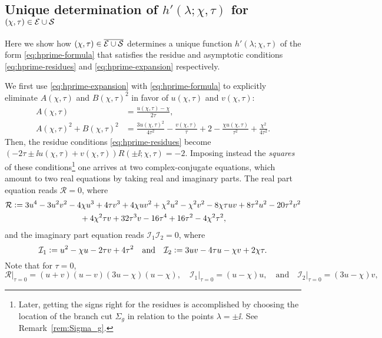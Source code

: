 
\subsection{Unique determination of $h'(\lambda;\chi,\tau)$ for $(\chi,\tau)\in\mathcal{E}\cup\mathcal{S}$}
\label{sec:g-function}
Here we show how $(\chi,\tau)\in\overline{\mathcal{E}\cup\mathcal{S}}$ determines a unique function $h'(\lambda;\chi,\tau)$ of the form \eqref{eq:hprime-formula} that satisfies the residue and asymptotic conditions \eqref{eq:hprime-residues} and \eqref{eq:hprime-expansion} respectively.  
 
We first use \eqref{eq:hprime-expansion} with \eqref{eq:hprime-formula} to explicitly eliminate $A(\chi,\tau)$ and $B(\chi,\tau)^2$ in favor of $u(\chi,\tau)$ and $v(\chi,\tau)$:
\begin{equation}
\begin{split}
A(\chi,\tau)&=\frac{u(\chi,\tau)-\chi}{2\tau},\\
A(\chi,\tau)^2+B(\chi,\tau)^2&=\frac{3u(\chi,\tau)^2}{4\tau^2}-\frac{v(\chi,\tau)}{\tau}+2-\frac{\chi u(\chi,\tau)}{\tau^2}+\frac{\chi^2}{4\tau^2}.
\end{split}
\label{eq:eliminate-AB}
\end{equation}
Then, the residue conditions \eqref{eq:hprime-residues} become $(-2\tau\pm\ii u(\chi,\tau)+v(\chi,\tau))R(\pm\ii;\chi,\tau)=-2$.  Imposing instead the \emph{squares} of these conditions\footnote{Later, getting the signs right for the residues is accomplished by choosing the location of the branch cut $\Sigma_g$ in relation to the points $\lambda=\pm\ii$.  See Remark~\ref{rem:Sigma_g}.} one arrives at two complex-conjugate equations, which amount to two real equations by taking real and imaginary parts.  The real part equation reads $\mathcal{R}=0$, where
\begin{multline}
\mathcal{R}\vcentcolon= 3u^4-3u^2v^2-4\chi u^3+4\tau v^3+4\chi uv^2+\chi^2u^2-\chi^2v^2-8\chi\tau uv+8\tau^2u^2-20\tau^2v^2\\{}+4\chi^2\tau v+32\tau^3v-16\tau^4+16\tau^2-4\chi^2\tau^2,
\end{multline}
and the imaginary part equation reads $\mathcal{I}_1\mathcal{I}_2=0$, where
\begin{equation}
\mathcal{I}_1\vcentcolon= u^2-\chi u-2\tau v+4\tau^2\quad\text{and}\quad
\mathcal{I}_2\vcentcolon= 3uv-4\tau u-\chi v+2\chi\tau.
\end{equation}
Note that for $\tau=0$,
\begin{equation}
\left.\mathcal{R}\right|_{\tau=0}=(u+v)(u-v)(3u-\chi)(u-\chi),\quad
\left.\mathcal{I}_1\right|_{\tau=0}=(u-\chi)u,\quad\text{and}\quad
\left.\mathcal{I}_2\right|_{\tau=0}=(3u-\chi)v,
\end{equation}
